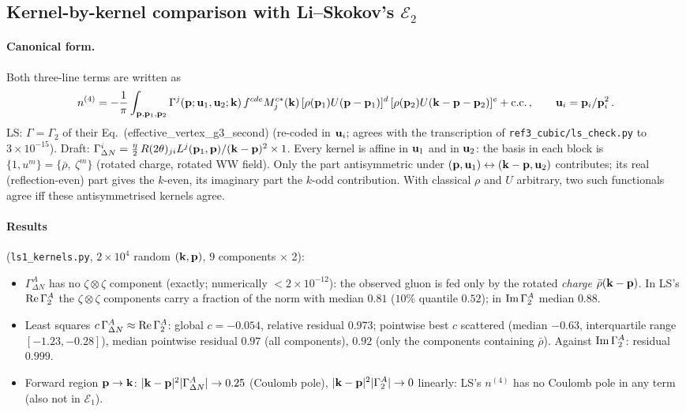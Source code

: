 \subsection{Kernel-by-kernel comparison with Li--Skokov's $\mathcal E_2$}\label{ls:kernels}
\paragraph{Canonical form.} Both three-line terms are written as
\begin{align}\label{ls:canon}
n^{(4)}=-\frac1\pi\int_{\mathbf{p},\mathbf{p}_1,\mathbf{p}_2}\Gamma^j(\mathbf{p};\mathbf{u}_1,\mathbf{u}_2;\mathbf{k})\,f^{cde}M^{c*}_j(\mathbf{k})\,[\rho(\mathbf{p}_1)U(\mathbf{p}-\mathbf{p}_1)]^d\,[\rho(\mathbf{p}_2)U(\mathbf{k}-\mathbf{p}-\mathbf{p}_2)]^e+{\rm c.c.}\,,\qquad\mathbf{u}_i=\mathbf{p}_i/\mathbf{p}_i^2\,.
\end{align} LS: $\Gamma=\Gamma_2$ of their Eq.~(effective\_vertex\_g3\_second) (re-coded in $\mathbf{u}_i$; agrees with the transcription of \texttt{ref3\_cubic/ls\_check.py} to $3\times10^{-15}$). Draft: $\Gamma^i_{\Delta N}=\frac\eta2\,R(2\theta)_{ji}L^j(\mathbf{p}_1,\mathbf{p})/(\mathbf{k}-\mathbf{p})^2\times1$. Every kernel is affine in $\mathbf{u}_1$ and in $\mathbf{u}_2$: the basis in each block is $\{1,u^m\}=\{\bar\rho,\ \zeta^m\}$ (rotated charge, rotated WW field). Only the part antisymmetric under $(\mathbf{p},\mathbf{u}_1)\leftrightarrow(\mathbf{k}-\mathbf{p},\mathbf{u}_2)$ contributes; its real (reflection-even) part gives the $k$-even, its imaginary part the $k$-odd contribution. With classical $\rho$ and $U$ arbitrary, two such functionals agree iff these antisymmetrised kernels agree.
\paragraph{Results} (\texttt{ls1\_kernels.py}, $2\times10^4$ random $(\mathbf{k},\mathbf{p})$, 9 components $\times$ 2):
\begin{itemize}
\item $\Gamma^A_{\Delta N}$ has no $\zeta\otimes\zeta$ component (exactly; numerically $<2\times10^{-12}$): the observed gluon is fed only by the rotated \emph{charge} $\bar\rho(\mathbf{k}-\mathbf{p})$. In LS's ${\rm Re}\,\Gamma^A_2$ the $\zeta\otimes\zeta$ components carry a fraction of the norm with median $0.81$ ($10\%$ quantile $0.52$); in ${\rm Im}\,\Gamma^A_2$ median $0.88$.
\item Least squares $c\,\Gamma^A_{\Delta N}\approx{\rm Re}\,\Gamma^A_2$: global $c=-0.054$, relative residual $0.973$; pointwise best $c$ scattered (median $-0.63$, interquartile range $[-1.23,-0.28]$), median pointwise residual $0.97$ (all components), $0.92$ (only the components containing $\bar\rho$). Against ${\rm Im}\,\Gamma_2^A$: residual $0.999$.
\item Forward region $\mathbf{p}\to\mathbf{k}$: $|\mathbf{k}-\mathbf{p}|^2|\Gamma_{\Delta N}^A|\to0.25$ (Coulomb pole), $|\mathbf{k}-\mathbf{p}|^2|\Gamma_2^A|\to0$ linearly: LS's $n^{(4)}$ has no Coulomb pole in any term (also not in $\mathcal E_1$).
\end{itemize}
